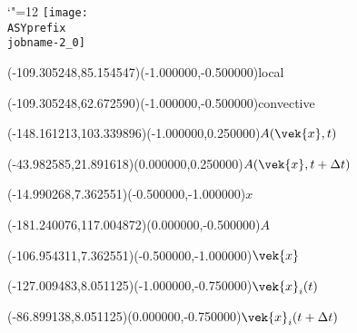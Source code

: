 \setlength{\unitlength}{1pt}%
\makeatletter%
\let\ASYencoding\f@encoding%
\let\ASYfamily\f@family%
\let\ASYseries\f@series%
\let\ASYshape\f@shape%
\makeatother%
{\catcode`"=12%
\texttt{[image: \\ASYprefix\\jobname-2\_0]}%
}%
%
%
\fontsize{7.500000}{9.000000}\selectfont%
\usefont{\ASYencoding}{\ASYfamily}{\ASYseries}{\ASYshape}%
\ASYalign(-109.305248,85.154547)(-1.000000,-0.500000){local}%
%
%
\fontsize{7.500000}{9.000000}\selectfont%
\ASYalign(-109.305248,62.672590)(-1.000000,-0.500000){convective}%
%
%
\fontsize{7.500000}{9.000000}\selectfont%
\ASYalign(-148.161213,103.339896)(-1.000000,0.250000){$A(\vek{x},t)$}%
%
%
\fontsize{7.500000}{9.000000}\selectfont%
\ASYalign(-43.982585,21.891618)(0.000000,0.250000){$A(\vek{x},t+\Delta t)$}%
%
%
\fontsize{7.500000}{9.000000}\selectfont%
\ASYalign(-14.990268,7.362551)(-0.500000,-1.000000){$x$}%
%
%
\fontsize{7.500000}{9.000000}\selectfont%
\ASYalign(-181.240076,117.004872)(0.000000,-0.500000){$A$}%
%
%
\fontsize{7.500000}{9.000000}\selectfont%
\ASYalign(-106.954311,7.362551)(-0.500000,-1.000000){$\vek{x}$}%
%
%
\fontsize{7.500000}{9.000000}\selectfont%
\ASYalign(-127.009483,8.051125)(-1.000000,-0.750000){$\vek{x}_i(t)$}%
%
%
\fontsize{7.500000}{9.000000}\selectfont%
\ASYalign(-86.899138,8.051125)(0.000000,-0.750000){$\vek{x}_i(t+\Delta t)$}%
